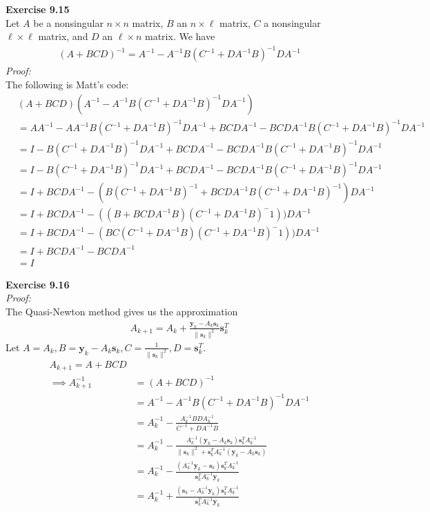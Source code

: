 \documentclass[letterpaper,12pt]{article}
\let\vec\mathbf
\theoremstyle{definition}
\begin{document}
\textbf{Exercise 9.15} \\
Let $A$ be a nonsingular $n \times n$ matrix, $B$ an $n \times \ell$ matrix, $C$ a nonsingular $\ell \times \ell$ matrix, and $D$ an $\ell \times n$ matrix. We have
\begin{align*}
  (A + BCD)^{-1} = A^{-1} - A^{-1} B(C^{-1} + DA^{-1}B)^{-1}DA^{-1}
\end{align*}
\textit{Proof:} \\
The following is Matt's code:
\begin{align*}
  &(A+BCD)(A^{-1} - A^{-1}B(C^{-1} + DA^{-1}B)^{-1}DA^{-1}) \\
  &= AA^{-1} - AA^{-1}B(C^{-1} + DA^{-1}B)^{-1}DA^{-1} + BCDA^{-1} - BCDA^{-1}B(C^{-1} + DA^{-1}B)^{-1}DA^{-1} \\
  &= I - B(C^{-1} + DA^{-1}B)^{-1}DA^{-1} + BCDA^{-1} - BCDA^{-1}B(C^{-1} + DA^{-1}B)^{-1}DA^{-1} \\
  &= I - B(C^{-1} + DA^{-1}B)^{-1}DA^{-1} + BCDA^{-1} - BCDA^{-1}B(C^{-1} + DA^{-1}B)^{-1}DA^{-1} \\
  &= I + BCDA^{-1} - (B(C^{-1} + DA^{-1}B)^{-1} + BCDA^{-1}B(C^{-1} + DA^{-1}B)^{-1})DA^{-1} \\
  &= I + BCDA^{-1} - ((B+BCDA^{-1}B)(C^{-1} + DA^{-1}B)^-{1}))DA^{-1} \\
  &= I + BCDA^{-1} - (BC(C^{-1}+DA^{-1}B)(C^{-1} + DA^{-1}B)^-{1}))DA^{-1} \\
  &= I + BCDA^{-1} - BCDA^{-1} \\
  &= I
\end{align*}

\textbf{Exercise 9.16} \\
\textit{Proof:} \\
The Quasi-Newton method gives us the approximation
\begin{align*}
  A_{k+1} = A_k + \frac{\vec{y}_k - A_k\vec{s}_k}{\|\vec{s}_k\|^2}\vec{s}_k^T
\end{align*}
Let $A = A_k, B = \vec{y}_k - A_k\vec{s}_k, C = \frac{1}{\|\vec{s}_k\|^2}, D = \vec{s}_k^T$.
\begin{align*}
  A_{k+1} = A + BCD
  \\
  \implies A_{k+1}^{-1} &= (A + BCD)^{-1}
  \\
  &= A^{-1} - A^{-1} B(C^{-1} + DA^{-1}B)^{-1}DA^{-1}
  \\
  &= A_k^{-1} - \frac{A_k^{-1} B DA_k^{-1}}{C^{-1} + DA^{-1}B}
  \\
  &= A_k^{-1} - \frac{A_k^{-1} (\vec{y}_k - A_k\vec{s}_k) \vec{s}_k^TA_k^{-1}}{\|\vec{s}_k\|^2 + \vec{s}_k^TA_k^{-1}(\vec{y}_k - A_k\vec{s}_k)}
  \\
  &= A_k^{-1} - \frac{(A_k^{-1}\vec{y}_k - \vec{s}_k) \vec{s}_k^TA_k^{-1}}{\vec{s}_k^TA_k^{-1}\vec{y}_k} \\
  &= A_k^{-1} + \frac{(\vec{s}_k - A_k^{-1}\vec{y}_k)\vec{s}_k^T A_k^{-1}}{\vec{s}_k^T A_k^{-1}\vec{y}_k}
\end{align*}
\end{document}
